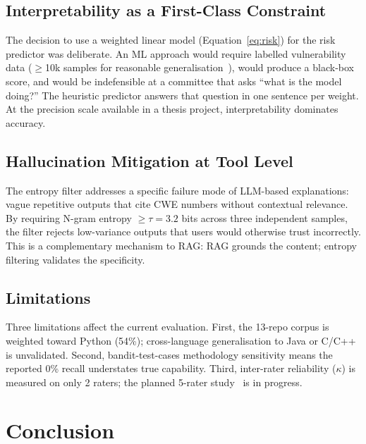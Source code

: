 \documentclass[conference]{IEEEtran}
\begin{document}
\subsection{Interpretability as a First-Class Constraint}

The decision to use a weighted linear model (Equation~\ref{eq:risk}) for the risk predictor was deliberate. An ML approach would require labelled vulnerability data ($\geq$10k samples for reasonable generalisation~\cite{croft2023data}), would produce a black-box score, and would be indefensible at a committee that asks ``what is the model doing?'' The heuristic predictor answers that question in one sentence per weight. At the precision scale available in a thesis project, interpretability dominates accuracy.

\subsection{Hallucination Mitigation at Tool Level}

The entropy filter addresses a specific failure mode of LLM-based explanations: vague repetitive outputs that cite CWE numbers without contextual relevance. By requiring N-gram entropy $\geq \tau = 3.2$ bits across three independent samples, the filter rejects low-variance outputs that users would otherwise trust incorrectly. This is a complementary mechanism to RAG: RAG grounds the content; entropy filtering validates the specificity.

\subsection{Limitations}

Three limitations affect the current evaluation. First, the 13-repo corpus is weighted toward Python (54\%); cross-language generalisation to Java or C/C++ is unvalidated. Second, bandit-test-cases methodology sensitivity means the reported 0\% recall understates true capability. Third, inter-rater reliability ($\kappa$) is measured on only 2 raters; the planned 5-rater study~\cite{fleiss1971measuring} is in progress.

\section{Conclusion}
\label{sec:conclusion}
\end{document}
